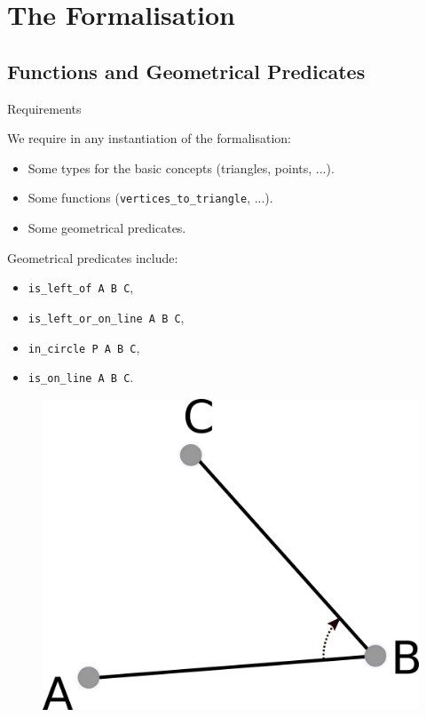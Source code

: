 \documentclass[18pt]{beamer}
\begin{document}
\section{The Formalisation}


\subsection{Functions and Geometrical Predicates}

\begin{frame}{Requirements}
 
 We require in any instantiation of the formalisation:
 \begin{itemize}
  \item Some types for the basic concepts (triangles, points, ...).
  \item Some functions ({\tt vertices\_to\_triangle}, ...).
  \item Some geometrical predicates.
 \end{itemize}
 Geometrical predicates include:
\vspace{0.15cm}

\begin{minipage}{.6\textwidth}
 \begin{itemize}
  \item<2-> {\tt is\_left\_of A B C},
  \item<3-> {\tt is\_left\_or\_on\_line A B C},
  \item<4-> {\tt in\_circle P A B C},
   \item<5-> {\tt is\_on\_line A B C}.
 \end{itemize}
\end{minipage}%
\begin{minipage}{.4\textwidth}
 \begin{overprint}
  \begin{figure}
  \centering
  \includegraphics[scale=1.3]{isleftof}
\end{figure}  
  

\end{overprint}
\end{minipage}
\end{frame}
\end{document}
